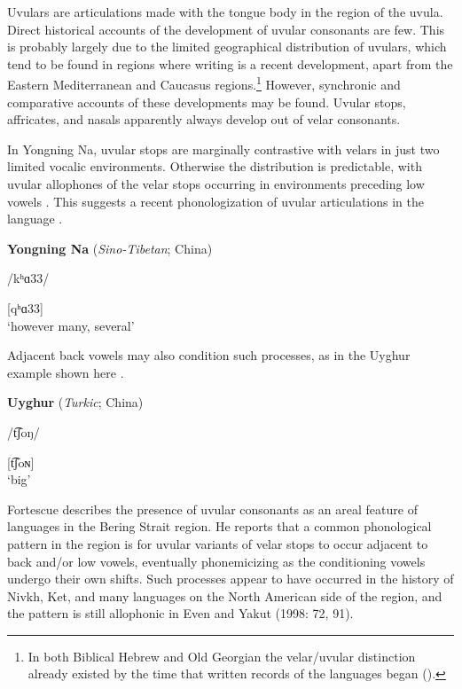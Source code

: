   Uvulars are articulations made with the tongue body in the region of the uvula. Direct historical accounts of the development of uvular consonants are few. This is probably largely due to the limited geographical distribution of uvulars, which tend to be found in regions where writing is a recent development, apart from the Eastern Mediterranean and Caucasus regions.\footnote{{In both Biblical Hebrew and Old Georgian the velar/uvular distinction already existed by the time that written records of the languages began (\citealt{Rendsburg1997,Butskhrikidze2002}).}}  However, synchronic and comparative accounts of these developments may be found. Uvular stops, affricates, and nasals apparently always develop out of velar consonants.

  In Yongning Na, uvular stops are marginally contrastive with velars in just two limited vocalic environments. Otherwise the distribution is predictable, with uvular allophones of the velar stops occurring in environments preceding low vowels . This suggests a recent phonologization of uvular articulations in the language \citep[28]{Lidz2010}.

\ea\label{ex:4.39}
  \textbf{Yongning Na} (\textit{Sino-Tibetan}; China)

/kʰɑ33/

[qʰɑ33]\\
\glt ‘however many, several’
\citep[80]{Lidz2010}
\z

Adjacent back vowels may also condition such processes, as in the Uyghur example shown here .

\ea\label{ex:4.40}
  \textbf{Uyghur} (\textit{Turkic}; China)

/t͡ʃoŋ/

[t͡ʃoɴ]\\
\glt ‘big’
\citep[76]{Hahn1991}
\z

  Fortescue describes the presence of uvular consonants as an areal feature of languages in the Bering Strait region. He reports that a common phonological pattern in the region is for uvular variants of velar stops to occur adjacent to back and/or low vowels, eventually phonemicizing as the conditioning vowels undergo their own shifts. Such processes appear to have occurred in the history of Nivkh, Ket, and many languages on the North American side of the region, and the pattern is still allophonic in Even and Yakut (1998: 72, 91).

